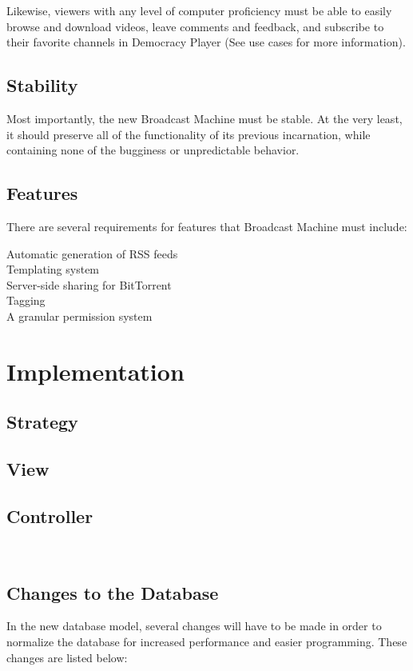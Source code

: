 \documentclass[a4paper,12pt]{report}
\begin{document}
Likewise, viewers with any level of computer proficiency must be able to easily browse and download videos, leave comments and feedback, and subscribe to their favorite channels in Democracy Player (See use cases for more information).
 

\section{Stability}
Most importantly, the new Broadcast Machine must be stable.
At the very least, it should preserve all of the functionality of its previous incarnation, while containing none of the bugginess or unpredictable behavior.


\section{Features}
There are several requirements for features that Broadcast Machine must include:
\begin{description}
\item[Automatic generation of RSS feeds]
\item[Templating system]
\item[Server-side sharing for BitTorrent]
\item[Tagging]
\item[A granular permission system]
\end{description}

\chapter{Implementation}

\section{Strategy}


\section{View}

\section{Controller}

\


\section{Changes to the Database}
In the new database model, several changes will have to be made in order to normalize the database for increased performance and easier programming. These changes are listed below:
\end{document}
